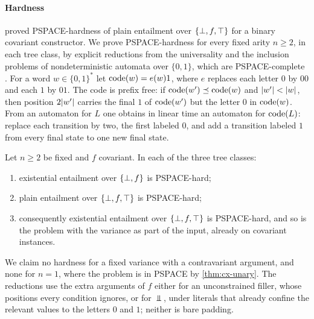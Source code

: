 \paragraph{Hardness}
 proved PSPACE-hardness of plain
entailment over $\{\bot,f,\top\}$ for a binary covariant constructor. We prove
PSPACE-hardness for every fixed arity $n\ge2$, in each tree class, by explicit
reductions from the universality and the inclusion problems of
nondeterministic automata over $\{0,1\}$, which are PSPACE-complete
\citep{StockmeyerMeyer73}. For a word $w\in\{0,1\}^*$ let
$\operatorname{code}(w)=e(w)1$, where $e$ replaces each letter $0$ by $00$ and each $1$ by
$01$. The code is prefix free: if $\operatorname{code}(w')\preceq\operatorname{code}(w)$ and
$\lvert w'\rvert<\lvert w\rvert$, then position $2\lvert w'\rvert$ carries the final $1$ of
$\operatorname{code}(w')$ but the letter $0$ in $\operatorname{code}(w)$. From an automaton for $L$ one
obtains in linear time an automaton for $\operatorname{code}(L)$: replace each transition
by two, the first labeled $0$, and add a transition labeled $1$ from every final
state to one new final state.

\begin{theorem}\label{thm:cx-hard}
Let $n\ge2$ be fixed and $f$ covariant. In each of the three tree classes:
\begin{enumerate}[leftmargin=*]
\item existential entailment over $\{\bot,f\}$ is PSPACE-hard;
\item plain entailment over $\{\bot,f,\top\}$ is PSPACE-hard;
\item consequently existential entailment over $\{\bot,f,\top\}$ is PSPACE-hard, and so is
  the problem with the variance as part of the input, already on covariant
  instances.
\end{enumerate}
\end{theorem}

We claim no hardness for a fixed variance with a contravariant argument, and
none for $n=1$, where the problem is in PSPACE by \cref{thm:cx-unary}. The
reductions use the extra arguments of $f$ either for an unconstrained filler,
whose positions every condition ignores, or for $\Bot$, under literals that
already confine the relevant values to the letters $0$ and $1$; neither is
bare padding.

